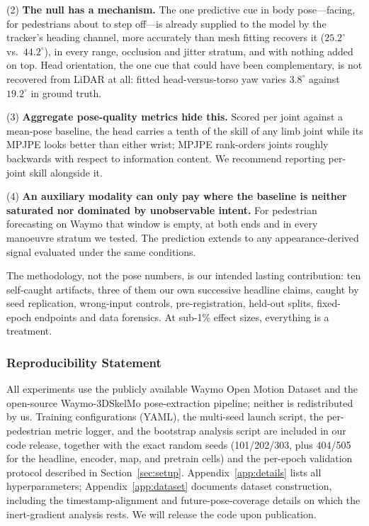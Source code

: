 \documentclass{article} %
\begin{document}
(2) \textbf{The null has a mechanism.} The one predictive cue in body
pose---facing, for pedestrians about to step off---is already supplied to the
model by the tracker's heading channel, more accurately than mesh fitting recovers
it ($25.2^\circ$ vs.\ $44.2^\circ$), in every range, occlusion and jitter stratum,
and with nothing added on top. Head orientation, the one cue that could have been
complementary, is not recovered from LiDAR at all: fitted head-versus-torso yaw
varies $3.8^\circ$ against $19.2^\circ$ in ground truth.

(3) \textbf{Aggregate pose-quality metrics hide this.} Scored per joint against a
mean-pose baseline, the head carries a tenth of the skill of any limb joint while
its MPJPE looks better than either wrist; MPJPE rank-orders joints roughly
backwards with respect to information content. We recommend reporting per-joint
skill alongside it.

(4) \textbf{An auxiliary modality can only pay where the baseline is neither
saturated nor dominated by unobservable intent.} For pedestrian forecasting on
Waymo that window is empty, at both ends and in every manoeuvre stratum we tested.
The prediction extends to any appearance-derived signal evaluated under the same
conditions.

The methodology, not the pose numbers, is our intended lasting contribution: ten
self-caught artifacts, three of them our own successive headline claims, caught by
seed replication, wrong-input controls, pre-registration, held-out splits,
fixed-epoch endpoints and data forensics. At sub-1\% effect sizes, everything is a
treatment.

\subsubsection*{Reproducibility Statement}
All experiments use the publicly available Waymo Open Motion Dataset and the
open-source Waymo-3DSkelMo pose-extraction pipeline; neither is redistributed by
us. Training configurations (YAML), the multi-seed launch script, the per-pedestrian
metric logger, and the bootstrap analysis script are included in our code release,
together with the exact random seeds (101/202/303, plus 404/505 for the headline,
encoder, map, and pretrain cells) and the per-epoch validation
protocol described in Section~\ref{sec:setup}. Appendix~\ref{app:details} lists
all hyperparameters; Appendix~\ref{app:dataset} documents dataset construction,
including the timestamp-alignment and future-pose-coverage details on which the
inert-gradient analysis rests. We will release the code upon publication.
\end{document}

